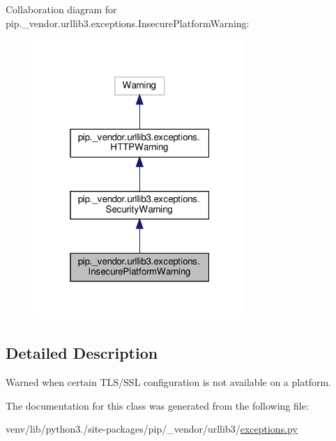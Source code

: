 Collaboration diagram for pip.\+\_\+vendor.\+urllib3.\+exceptions.\+Insecure\+Platform\+Warning\+:
\nopagebreak
\begin{figure}[H]
\begin{center}
\leavevmode
\includegraphics[width=229pt]{classpip_1_1__vendor_1_1urllib3_1_1exceptions_1_1InsecurePlatformWarning__coll__graph}
\end{center}
\end{figure}


\subsection{Detailed Description}
\begin{DoxyVerb}Warned when certain TLS/SSL configuration is not available on a platform.\end{DoxyVerb}
 

The documentation for this class was generated from the following file\+:\begin{DoxyCompactItemize}
\item 
venv/lib/python3./site-\/packages/pip/\+\_\+vendor/urllib3/\hyperlink{pip_2__vendor_2urllib3_2exceptions_8py}{exceptions.\+py}\end{DoxyCompactItemize}
